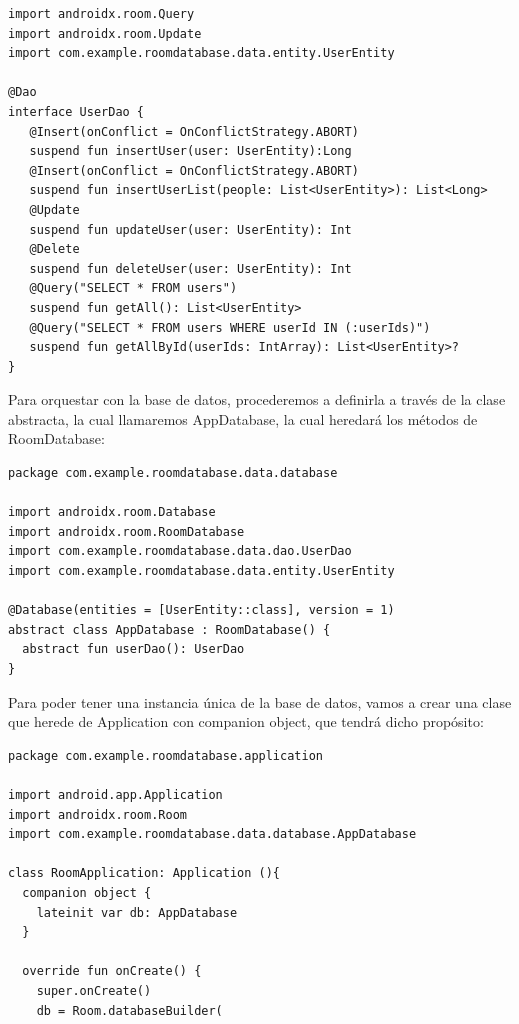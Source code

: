 \documentclass[10pt,letterpaper]{article}
\begin{document}

\newpage
\begin{lstlisting}
import androidx.room.Query
import androidx.room.Update
import com.example.roomdatabase.data.entity.UserEntity

@Dao
interface UserDao {
   @Insert(onConflict = OnConflictStrategy.ABORT)
   suspend fun insertUser(user: UserEntity):Long
   @Insert(onConflict = OnConflictStrategy.ABORT)
   suspend fun insertUserList(people: List<UserEntity>): List<Long>
   @Update
   suspend fun updateUser(user: UserEntity): Int
   @Delete
   suspend fun deleteUser(user: UserEntity): Int
   @Query("SELECT * FROM users")
   suspend fun getAll(): List<UserEntity>
   @Query("SELECT * FROM users WHERE userId IN (:userIds)")
   suspend fun getAllById(userIds: IntArray): List<UserEntity>?
}
\end{lstlisting}

Para orquestar con la base de datos, procederemos a definirla a través de la clase abstracta, la cual llamaremos AppDatabase, la cual heredará los métodos de RoomDatabase:

\begin{lstlisting}
package com.example.roomdatabase.data.database

import androidx.room.Database
import androidx.room.RoomDatabase
import com.example.roomdatabase.data.dao.UserDao
import com.example.roomdatabase.data.entity.UserEntity

@Database(entities = [UserEntity::class], version = 1)
abstract class AppDatabase : RoomDatabase() {
  abstract fun userDao(): UserDao
}
\end{lstlisting}

Para poder tener una instancia única de la base de datos, vamos a crear una clase que herede de Application con companion object, que tendrá dicho propósito:

\begin{lstlisting}
package com.example.roomdatabase.application

import android.app.Application
import androidx.room.Room
import com.example.roomdatabase.data.database.AppDatabase

class RoomApplication: Application (){
  companion object {
    lateinit var db: AppDatabase
  }

  override fun onCreate() {
    super.onCreate()
    db = Room.databaseBuilder(
\end{lstlisting}

\end{document}
